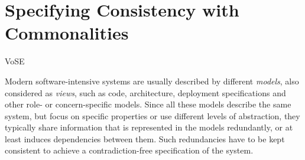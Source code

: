 \chapter{Specifying Consistency with Commonalities 
}
\label{chap:commonalities}

\begin{copiedFrom}{VoSE}

Modern %
software-intensive systems are usually described by different \emph{models}, also considered as \emph{views}, such as code, architecture, deployment specifications and other role- or concern-specific models.
Since all these models describe the same system, but focus on specific properties or use different levels of abstraction, they typically share information that is represented in the models redundantly, or at least induces dependencies between them.
Such redundancies have to be kept consistent to achieve a contradiction-free specification of the %
system.




\end{copiedFrom}
